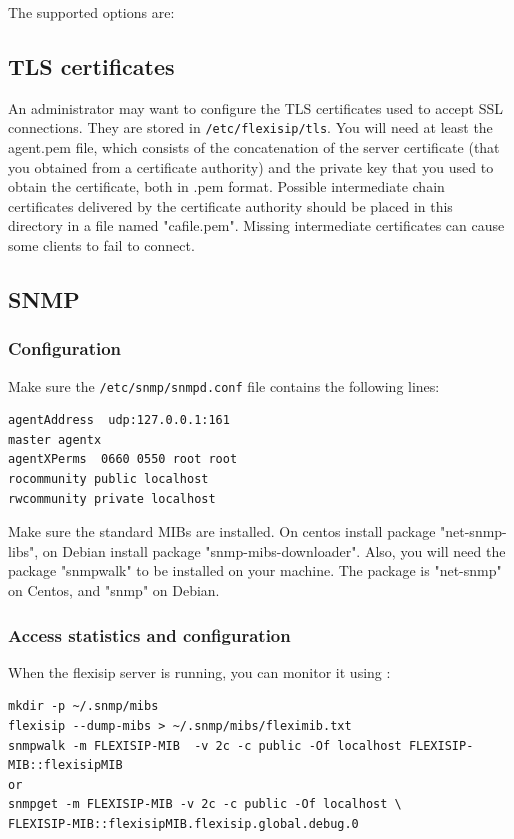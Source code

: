 \documentclass[a4paper,10pt]{article}
\begin{document}
The supported options are:





\subsection{TLS certificates}
An administrator may want to configure the TLS certificates used to accept SSL connections.
They are stored in \verb|/etc/flexisip/tls|. You will need at least the agent.pem file, which consists of the concatenation of the server certificate
(that you obtained from a certificate authority) and the private key that you used to obtain the certificate, both in .pem format. Possible intermediate chain certificates delivered by the certificate authority should be placed in this directory in a file named "cafile.pem". Missing intermediate certificates can cause some clients to fail to connect.

\subsection{SNMP}
\subsubsection{Configuration}
Make sure the \verb|/etc/snmp/snmpd.conf| file contains the following lines:
\begin{verbatim}
agentAddress  udp:127.0.0.1:161
master agentx
agentXPerms  0660 0550 root root
rocommunity public localhost
rwcommunity private localhost
\end{verbatim}

Make sure the standard MIBs are installed.
On centos install package "net-snmp-libs", on Debian install package "snmp-mibs-downloader".
Also, you will need the package "snmpwalk" to be installed on your machine. The package is "net-snmp" on Centos, and "snmp" on Debian.



\subsubsection{Access statistics and configuration}
When the flexisip server is running, you can monitor it using :
\begin{verbatim}
mkdir -p ~/.snmp/mibs
flexisip --dump-mibs > ~/.snmp/mibs/fleximib.txt
snmpwalk -m FLEXISIP-MIB  -v 2c -c public -Of localhost FLEXISIP-MIB::flexisipMIB
or
snmpget -m FLEXISIP-MIB -v 2c -c public -Of localhost \
FLEXISIP-MIB::flexisipMIB.flexisip.global.debug.0
\end{verbatim}
\end{document}

